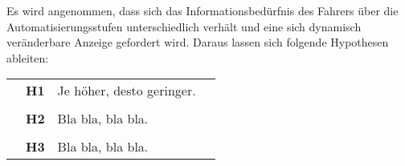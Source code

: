 Es wird angenommen, dass sich das Informationsbedürfnis des Fahrers über die Automatisierungsstufen unterschiedlich verhält und eine sich dynamisch veränderbare Anzeige gefordert wird. Daraus lassen sich folgende Hypothesen ableiten: \\

\begin{longtable}{p{0.3cm} p{0.5cm} p{13cm} p{0.5cm}}
	& \textbf{H1}	& Je höher, desto geringer. & \\
	& & & \\
	& \textbf{H2}	& Bla bla, bla bla. & \\
	& & & \\
	& \textbf{H3}	& Bla bla, bla bla. & \\
\end{longtable}